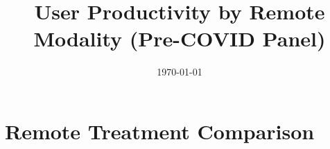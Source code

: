 \documentclass{article}
\title{User Productivity by Remote Modality (Pre-COVID Panel)}
\author{}
\date{\today}
\begin{document}
\maketitle

\section*{Remote Treatment Comparison}

\end{document}
